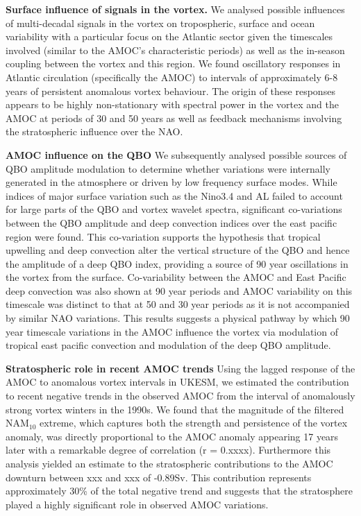 \textbf{Surface influence of signals in the vortex.}
We analysed possible influences of multi-decadal signals in the vortex on tropospheric, surface and ocean variability with a particular focus on the Atlantic sector given the timescales involved (similar to the AMOC's characteristic periods) as well as the in-season coupling between the vortex and this region. We found oscillatory responses in Atlantic circulation (specifically the AMOC) to intervals of approximately 6-8 years of persistent anomalous vortex behaviour. The origin of these responses appears to be highly non-stationary with spectral power in the vortex and the AMOC at periods of 30 and 50 years as well as feedback mechanisms involving the stratospheric influence over the NAO. 

\textbf{AMOC influence on the QBO}
We subsequently analysed possible sources of QBO amplitude modulation to determine whether variations were internally generated in the atmosphere or driven by low frequency surface modes. While indices of major surface variation such as the Nino3.4 and AL failed to account for large parts of the QBO and vortex wavelet spectra, significant co-variations between the QBO amplitude and deep convection indices over the east pacific region were found. This co-variation supports the hypothesis that tropical upwelling and deep convection alter the vertical structure of the QBO and hence the amplitude of a deep QBO index, providing a source of 90 year oscillations in the vortex from the surface. Co-variability between the AMOC and East Pacific deep convection was also shown at 90 year periods and AMOC variability on this timescale was distinct to that at 50 and 30 year periods as it is not accompanied by similar NAO variations. This results suggests a physical pathway by which 90 year timescale variations in the AMOC influence the vortex via modulation of tropical east pacific convection and modulation of the deep QBO amplitude. 

\textbf{Stratospheric role in recent AMOC trends}
Using the lagged response of the AMOC to anomalous vortex intervals in UKESM, we estimated the contribution to recent negative trends in the observed AMOC from the interval of anomalously strong vortex winters in the 1990s. We found that the magnitude of the filtered NAM$_{10}$ extreme, which captures both the strength and persistence of the vortex anomaly, was directly proportional to the AMOC anomaly appearing 17 years later with a remarkable degree of correlation (r = 0.xxxx). Furthermore this analysis yielded an estimate to the stratospheric contributions to the AMOC downturn between xxx and xxx of -0.89Sv. This contribution represents approximately 30\% of the total negative trend and suggests that the stratosphere played a highly significant role in observed AMOC variations. 

